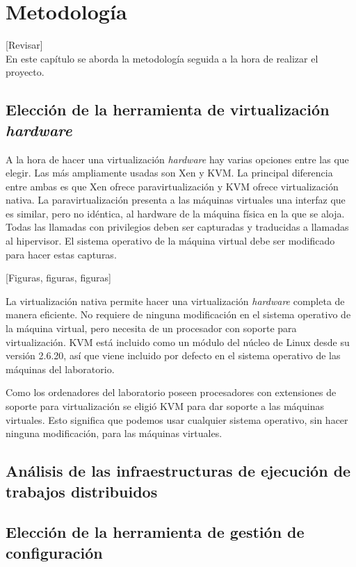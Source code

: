 \chapter{Metodología}
\label{cap:metodologia}

[Revisar]\\

En este capítulo se aborda la metodología seguida a la hora de realizar el proyecto.


\section{Elección de la herramienta de virtualización \emph{hardware}}

A la hora de hacer una virtualización \emph{hardware} hay varias opciones entre las que elegir. Las más ampliamente usadas son Xen y KVM. La principal diferencia entre ambas es que Xen ofrece paravirtualización y KVM ofrece virtualización nativa.
La paravirtualización presenta a las máquinas virtuales una interfaz que es similar, pero no idéntica, al hardware de la máquina física en la que se aloja. Todas las llamadas con privilegios deben ser capturadas y traducidas a llamadas al hipervisor. El sistema operativo de la máquina virtual debe ser modificado para hacer estas capturas.

[Figuras, figuras, figuras]

La virtualización nativa permite hacer una virtualización \emph{hardware} completa de manera eficiente. No requiere de ninguna modificación en el sistema operativo de la máquina virtual, pero necesita de un procesador con soporte para virtualización. KVM está incluido como un módulo del núcleo de Linux desde su versión 2.6.20, así que viene incluido por defecto en el sistema operativo de las máquinas del laboratorio.

Como los ordenadores del laboratorio poseen procesadores con extensiones de soporte para virtualización se eligió KVM para dar soporte a las máquinas virtuales. Esto significa que podemos usar cualquier sistema operativo, sin hacer ninguna modificación, para las máquinas virtuales.

\section{Análisis de las infraestructuras de ejecución de trabajos distribuidos}


\section{Elección de la herramienta de gestión de configuración}

